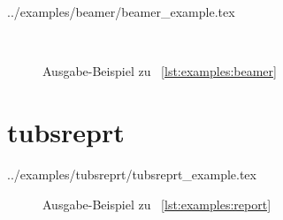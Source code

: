 {  %
    {../examples/beamer/beamer_example.tex}
  
    \begin{figure}
    \begin{minipage}{0.49\textwidth}\centering
    \end{minipage}\hfill
    \begin{minipage}{0.49\textwidth}\centering
    \end{minipage}\\[3mm]
    \begin{minipage}{0.49\textwidth}\centering
    \end{minipage}\hfill
    \begin{minipage}{0.49\textwidth}\centering
    \end{minipage}
    \caption{Ausgabe-Beispiel zu \lstlistingname~\ref{lst:examples:beamer}}
    \label{fig:examples:tubsposter}
  \end{figure}

\clearpage
\section{tubsreprt}

    {../examples/tubsreprt/tubsreprt_example.tex}

  \begin{figure}\centering
    \begin{minipage}{0.49\textwidth}
    \end{minipage}\hfill
    \begin{minipage}{0.49\textwidth}
    \end{minipage}
    \begin{minipage}{0.49\textwidth}
    \end{minipage}\hfill
    \begin{minipage}{0.49\textwidth}
    \end{minipage}
    \caption{Ausgabe-Beispiel zu \lstlistingname~\ref{lst:examples:report}}
    \label{fig:examples:tubsposter}
  \end{figure}

}

